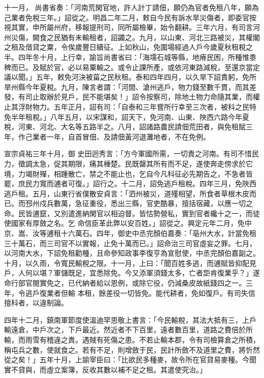 \begin{pinyinscope}
 十一月，
 尚書省奏：「河南荒閑官地，許人計丁請佃，願仍為官者免租八年，願為己業者免稅三年。」詔從之。明昌二年二月，敕自今民有訴水旱災傷者，即委官按視其實，申所屬州府，移報提刑司，同所屬檢畢，始令翻耕。三年六月，有司言河州災傷，闕食之民猶有未輸租者，詔蠲之。九月，以山東、河北三路被災，其權閣之租及借貸之粟，令俟歲豐日續征。上如秋山，免圍場經過人戶今歲夏秋租稅之半。四年冬十月，上行幸，諭旨尚書省曰：「海壖石城等縣，地瘠民困，所種惟黍稗而已。及賦於官，必以易粟輸之。或令止課所產，或依河東路減稅，至還京當定
 議以聞。」五年，敕免河決被菑之民秋租。泰和四年四月，以久旱下詔責躬，免所旱州縣今年夏稅。九月，陳言者謂：「河間、滄州逃戶，物力錢至數千貫，而其差發，有司止取辦於見戶，民不能堪矣！」詔令按察司，除地土物力命隨其業，而權止其浮財物力。五年正月，詔有司：「自泰和三年嘗所行幸至三次者，被科之民特免半年租稅。」八年五月，以宋謀和，詔天下，免河南、山東、陜西六路今年夏稅，河東、河北、大名等五路半之。八月，詔諸路農民請佃荒田者，與免租賦三年，作己業者一年，自首冒佃、及請佃黃河退灘地者，不在免例。



 宣宗貞祐三年十月，御
 史田迥秀言：「方今軍國所需，一切責之河南。有司不惜民力，徵調太急，促其期限，痛其棰楚。民既罄其所有而不足，遂使奔走傍求於它境，力竭財殫，相踵散亡，禁之不能止也，乞自今凡科征必先期告之，不急者皆罷，庶民力寬而逋者可復。」詔行之。十二月，詔免逃戶租稅。四年三月，免陜西逃戶租。五月，山東行省僕散安貞言：「泗州被災，道殣相望，所食者草根木皮而已。而邳州戍兵數萬，急征重役，悉出三縣，官吏酷暴，擅括宿藏，以應一切之命。民皆逋竄，又別遣進納閑官以相迫督。皆怙勢營私，實到官者纔十之一，而徒使國家有厚斂之名。乞
 命信臣革此弊以安百姓。」詔從之。興定元年二月，免中京、嵩、汝等逋租十六萬石。四年，御史中丞完顏伯嘉奏：「亳州大水，計當免租三十萬石，而三司官不以實報，止免十萬而已。」詔命治三司官虛妄之罪。七月，以河南大水，下詔免租勸種，且命參知政事李復亨為宣慰使，中丞完顏伯嘉副之。十月，以久雨，令寬民輸稅之限。十一月，上曰：「聞百姓多逃，而逋賦皆抑配見戶，人何以堪？軍儲既足，宜悉除免。今又添軍須錢太多，亡者詎肯復業乎？」遂命行部官閱實免之，已代納者給以恩例，或除它役，仍減桑皮故紙錢四之一。三年，令逃戶復業者但輸
 本租，餘差役一切皆免。能代耕者，免如復戶。有司失信擅科者，以違制論。



 四年十二月，鎮南軍節度使溫迪罕思敬上書言：「今民輸稅，其法大抵有三，上戶輸遠倉，中戶次之，下戶最近。然近者不下百里，遠者數百里，道路之費倍於所輸，而雨雪有稽違之責。遇賊有死傷之患。不若止輸本郡，令有司檢算倉之所積，稱屯兵之數，使就食之。若有不足，則增斂于民，民計所斂不及道里之費，將忻然從之矣！」五年十月，上諭宰臣曰：「比欲民多種麥，故令所在官貸易麥種。今聞實不貸與，而虛立案簿，反收其數以補不足之租。其遣使究治。」




\end{pinyinscope}
